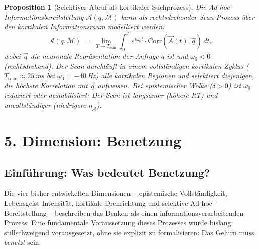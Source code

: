 ﻿\documentclass[12pt,a4paper]{report}
\theoremstyle{plain}
\newtheorem{proposition}[theorem]{Proposition}
\theoremstyle{definition}
\theoremstyle{remark}
\begin{document}
	\begin{proposition}[Selektiver Abruf als kortikaler Suchprozess]
		\label{prop:scan}
		Die Ad-hoc-Information\-sbereitstellung $\mathcal{A}(q, \mathcal{M})$
		kann als rechtsdrehender Scan-Prozess über den kortikalen Informationsraum
		modelliert werden:
		\[
		\mathcal{A}(q, \mathcal{M})
		\;=\;
		\lim_{T\to T_{\mathrm{scan}}}
		\int_0^T e^{i\omega_0 t} \cdot \mathrm{Corr}(\vec{A}(t), \vec{q})\,dt,
		\]
		wobei $\vec{q}$ die neuronale Repräsentation der Anfrage $q$ ist
		und $\omega_0 < 0$ (rechtsdrehend).
		Der Scan durchläuft in einem vollständigen kortikalen Zyklus
		($T_{\mathrm{scan}} \approx 25$\,ms bei $\omega_0 = -40$\,Hz)
		alle kortikalen Regionen und selektiert diejenigen, die höchste
		Korrelation mit $\vec{q}$ aufweisen.
		Bei epistemischer Wolke ($\delta > 0$) ist $\omega_0$ reduziert
		oder destabilisiert: Der Scan ist langsamer (höhere RT) und
		unvollständiger (niedrigere $\eta_{\mathcal{A}}$).
	\end{proposition}
	
	\chapter{5. Dimension: Benetzung}

	\section{Einführung: Was bedeutet Benetzung?}

	Die vier bisher entwickelten Dimensionen -- epistemische Vollständigkeit,
	Lebensgeist-Intensität, kortikale Drehrichtung und selektive
	Ad-hoc-Bereitstellung -- beschreiben das Denken als einen
	informationsverarbeitenden Prozess. Eine fundamentale Voraussetzung
	dieses Prozesses wurde bislang stillschweigend vorausgesetzt, ohne sie
	explizit zu formalisieren: Das Gehirn muss \emph{benetzt} sein.
\end{document}
